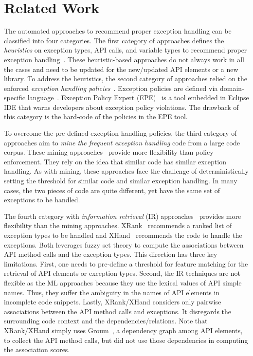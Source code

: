 \section{Related Work}
\label{sec:related}

The automated approaches to recommend proper exception handling can be
classified into four categories. The first category of approaches
defines the {\em heuristics} on exception types, API calls, and
variable types to recommend proper exception
handling~\cite{barbosa-bsse12}. These heuristic-based approaches do
not always work in all the cases and need to be updated for the
new/updated API elements or a new library. To address the heuristics,
the second category of approaches relied on the enforced {\em
  exception handling policies}~\cite{barbosa-tse16,barbosa-saner18}.
Exception policies are defined via domain-specific
language~\cite{barbosa-tse16}. Exception Policy Expert
(EPE)~\cite{barbosa-saner18} is a tool embedded in Eclipse IDE that
warns developers about exception policy violations. The drawback of
this category is the hard-code of the policies in the EPE tool.

To overcome the pre-defined exception handling policies, the third
category of approaches aim to {\em mine the frequent exception
  handling} code from a large code corpus. These mining
approaches~\cite{chanchal-scam14} provide more flexibility than policy
enforcement. They rely on the idea that similar code has similar
exception handling. As with mining, these approaches face the
challenge of deterministically setting the threshold for similar code
and similar exception handling. In many cases, the two pieces of code
are quite different, yet have the same set of exceptions to be
handled.

The fourth category with {\em information retrieval} (IR)
approaches~\cite{xrank-fse20} provides more flexibility than the
mining approaches. XRank~\cite{xrank-fse20} recommends a ranked list
of exception types to be handled and XHand~\cite{xrank-fse20}
recommends the code to handle the exceptions. Both leverages fuzzy set
theory to compute the associations between API method calls and the
exception types. This direction has three key limitations. First, one
needs to pre-define a threshold for feature matching for the retrieval
of API elements or exception types. Second, the IR techniques are not
flexible as the ML approaches because they use the lexical values of
API simple names. Thus, they suffer the ambiguity in the names of API
elements in incomplete code snippets. Lastly, XRank/XHand considers
only pairwise associations between the API method calls and
exceptions. It disregards the surrounding code context and the
dependencies/relations. Note that XRank/XHand simply uses
Groum~\cite{fse09}, a dependency graph among API elements, to collect
the API method calls, but did not use those dependencies in computing
the association scores.

